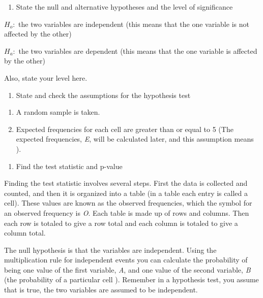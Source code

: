 \documentclass[]{book}
\providecommand{\tightlist}{%
  \setlength{\itemsep}{0pt}\setlength{\parskip}{0pt}}
\begin{document}
\begin{enumerate}
\def\labelenumi{\arabic{enumi}.}
\tightlist
\item
  State the null and alternative hypotheses and the level of significance
\end{enumerate}

\(H_o:\) the two variables are independent (this means that the one variable is not affected by the other)

\(H_a:\) the two variables are dependent (this means that the one variable is affected by the other)

Also, state your level here.

\begin{enumerate}
\def\labelenumi{\arabic{enumi}.}
\setcounter{enumi}{1}
\tightlist
\item
  State and check the assumptions for the hypothesis test
\end{enumerate}

\begin{enumerate}
\def\labelenumi{\alph{enumi}.}
\item
  A random sample is taken.
\item
  Expected frequencies for each cell are greater than or equal to 5 (The expected frequencies, \emph{E}, will be calculated later, and this assumption means ).
\end{enumerate}

\begin{enumerate}
\def\labelenumi{\arabic{enumi}.}
\setcounter{enumi}{2}
\tightlist
\item
  Find the test statistic and p-value
\end{enumerate}

Finding the test statistic involves several steps. First the data is collected and counted, and then it is organized into a table (in a table each entry is called a cell). These values are known as the observed frequencies, which the symbol for an observed frequency is \emph{O}. Each table is made up of rows and columns. Then each row is totaled to give a row total and each column is totaled to give a column total.

The null hypothesis is that the variables are independent. Using the multiplication rule for independent events you can calculate the probability of being one value of the first variable, \emph{A}, and one value of the second variable, \emph{B} (the probability of a particular cell ). Remember in a hypothesis test, you assume that is true, the two variables are assumed to be independent.
\end{document}
